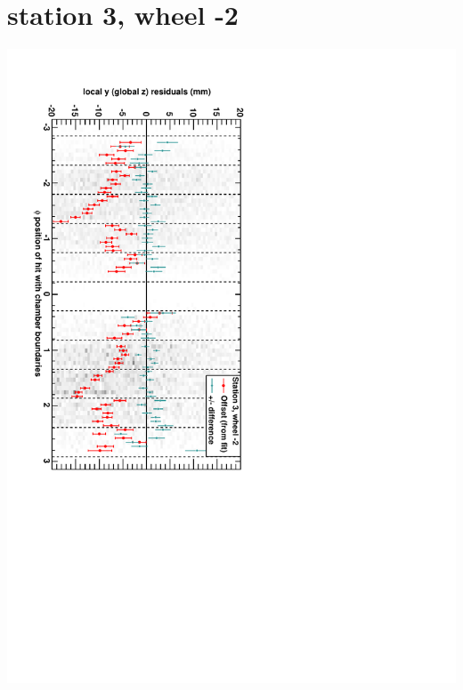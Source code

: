 \documentclass[compress]{beamer}
\begin{document}
\section*{station 3, wheel -2}
\begin{frame} \vfill \mbox{\hspace{-1 cm}\includegraphics[height=1.2\linewidth, angle=90]{DTzVsPhi_st3_whA.pdf}} \end{frame}
\end{document}

